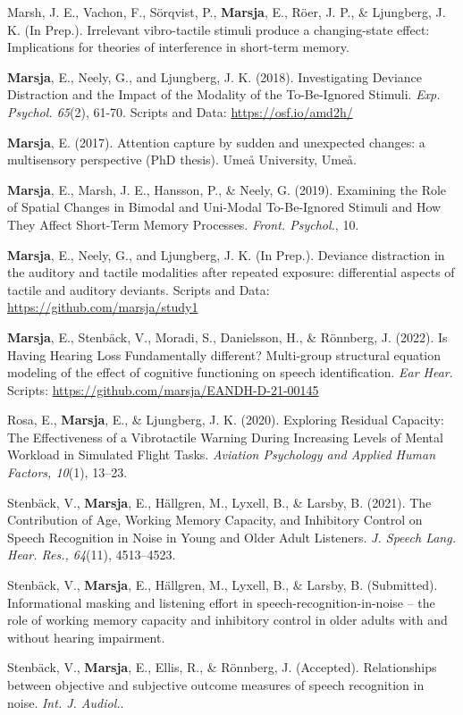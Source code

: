 \documentclass[]{article}
\begin{document}
Marsh, J. E., Vachon, F., Sörqvist, P., \textbf{Marsja}, E., Röer, J.
P., \& Ljungberg, J. K. (In Prep.). Irrelevant vibro-tactile stimuli
produce a changing-state effect: Implications for theories of
interference in short-term memory.

\textbf{Marsja}, E., Neely, G., and Ljungberg, J. K. (2018).
Investigating Deviance Distraction and the Impact of the Modality of the
To-Be-Ignored Stimuli. \emph{Exp. Psychol. 65}(2), 61-70. Scripts and
Data: \url{https://osf.io/amd2h/}

\textbf{Marsja}, E. (2017). Attention capture by sudden and unexpected
changes: a multisensory perspective (PhD thesis). Umeå University, Umeå.

\textbf{Marsja}, E., Marsh, J. E., Hansson, P., \& Neely, G. (2019).
Examining the Role of Spatial Changes in Bimodal and Uni-Modal
To-Be-Ignored Stimuli and How They Affect Short-Term Memory Processes.
\emph{Front. Psychol.}, 10.

\textbf{Marsja}, E., Neely, G., and Ljungberg, J. K. (In Prep.).
Deviance distraction in the auditory and tactile modalities after
repeated exposure: differential aspects of tactile and auditory
deviants. Scripts and Data: \url{https://github.com/marsja/study1}

\textbf{Marsja}, E., Stenbäck, V., Moradi, S., Danielsson, H., \&
Rönnberg, J. (2022). Is Having Hearing Loss Fundamentally different?
Multi-group structural equation modeling of the effect of cognitive
functioning on speech identification. \emph{Ear Hear}. Scripts:
\url{https://github.com/marsja/EANDH-D-21-00145}

Rosa, E., \textbf{Marsja}, E., \& Ljungberg, J. K. (2020). Exploring
Residual Capacity: The Effectiveness of a Vibrotactile Warning During
Increasing Levels of Mental Workload in Simulated Flight Tasks.
\emph{Aviation Psychology and Applied Human Factors, 10}(1), 13--23.

Stenbäck, V., \textbf{Marsja}, E., Hällgren, M., Lyxell, B., \& Larsby,
B. (2021). The Contribution of Age, Working Memory Capacity, and
Inhibitory Control on Speech Recognition in Noise in Young and Older
Adult Listeners. \emph{J. Speech Lang. Hear. Res., 64}(11), 4513--4523.

Stenbäck, V., \textbf{Marsja}, E., Hällgren, M., Lyxell, B., \& Larsby,
B. (Submitted). Informational masking and listening effort in
speech-recognition-in-noise -- the role of working memory capacity and
inhibitory control in older adults with and without hearing impairment.

Stenbäck, V., \textbf{Marsja}, E., Ellis, R., \& Rönnberg, J.
(Accepted). Relationships between objective and subjective outcome
measures of speech recognition in noise. \emph{Int. J. Audiol.}.
\end{document}
